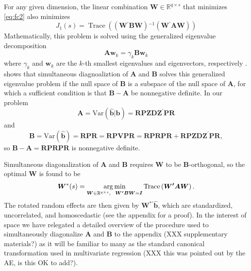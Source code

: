 \documentclass[12pt]{article} %
\newcommand{\inv}{\ensuremath{^{-1}}}
\newcommand{\trans}{\ensuremath{^\prime}}
\newcommand{\var}{\ensuremath{\mathrm{Var}}}
\DeclareMathOperator{\tr}{Trace}
\DeclareMathOperator*{\argmin}{arg\, min}
\begin{document}
{For any given dimension, the linear combination $\bm{W} \in \mathbb{R}^{q \times s}$ that minimizes \eqref{eq:fc2} also minimizes
%
\begin{equation}\label{eq:minimize}
J_1(s) = \tr\left( \left(\bm{W\trans B W} \right)\inv \left(\bm{W\trans A W}\right) \right)
\end{equation}
%
Mathematically, this problem is solved using the generalized eigenvalue decomposition
%
\begin{equation}\label{eq:geigen}
	\bm{Aw}_k = \gamma_k \bm{Bw}_k
\end{equation}
%
where $\gamma_k$ and $\bm{w}_k$ are the $k$-th smallest eigenvalues and eigenvectors, respectively \citep{Fukunaga:1990}. 
\cite{deLeeuw:1982to} shows that simultaneous diagnoaliztion of $\bm{A}$ and $\bm{B}$ solves this generalized eigenvalue problem if the null space of $\bm{B}$ is a subspace of the null space of $\bm{A}$, for which a sufficient condition is that $\bm{B} - \bm{A}$ be nonnegative definite. In our problem 
\[
	\bm{A} =  \var(\widehat{\bm{b}} | \bm{b} ) = \bm{RPZDZ}^\prime \bm{PR}
\]
and
\[
	\bm{B} = \var(\widehat{\bm{b}}) =  \bm{RPR} =  \bm{RPVPR}  = \bm{RPRPR} + \bm{RPZDZ}^\prime\bm{PR},
\]
so $\bm{B}-\bm{A} =  \bm{RPRPR}$ is nonnegative definite.

Simultaneous diagonalization of $\bm{A}$ and $\bm{B}$ requires $\bm{W}$ to be $\bm{B}$-orthogonal, so the optimal $\bm{W}$ is found to be
%
\begin{equation}\label{eq:optimw}
	\bm{W}^*(s) = \argmin_{ 
      \bm{W} \in \mathbb{R}^{q \times s}, \ \ 
      \bm{W\trans B W} = \bm{I}
	} 
\tr\left( \bm{W\trans A W} \right).
\end{equation}
%
The rotated random effects are then given by $\bm{W}^{*\prime} \widehat{\bm{b}}$, which are standardized, uncorrelated, and homoscedastic (see the appendix for a proof). In the interest of space we have relegated a detailed overview of the procedure used to simultaneously diagonalize $\bm{A}$ and $\bm{B}$ to the appendix (XXX supplementary materials?) as it will be familiar to many as the standard canonical transformation used in multivariate regression (XXX this was pointed out by the AE, is this OK to add?).


}
\end{document}
